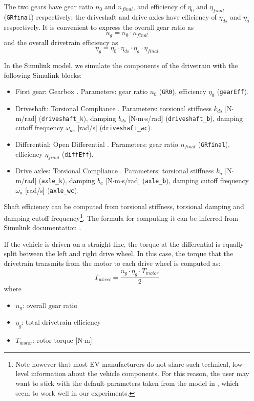 The two gears have gear ratio $n_0$ and $n_{final}$, and efficiency of $\eta_0$ and $\eta_{final}$ (\texttt{GRfinal}) respectively; the driveshaft and drive axles have efficiency of $\eta_{ds}$ and $\eta_a$ respectively. It is convenient to express the overall gear ratio as
\begin{equation}
    n_g = n_0 \cdot n_{final}
\end{equation}
and the overall drivetrain efficiency as
\begin{equation}
    \eta_g = \eta_0 \cdot \eta_{ds} \cdot \eta_a \cdot \eta_{final}
\end{equation}

In the Simulink model, we simulate the components of the drivetrain with the following Simulink blocks:
\begin{itemize}
    \item First gear: Gearbox \cite{mathworks:gearbox}. Parameters: gear ratio $n_0$ (\texttt{GR0}), efficiency $\eta_0$ (\texttt{gearEff}).
    \item Driveshaft: Torsional Compliance \cite{mathworks:torsional_compliance}. Parameters: torsional stiffness $k_{ds}$ [N$\cdot$m/rad] (\texttt{driveshaft\_k}), damping $b_{ds}$ [N$\cdot$m$\cdot$s/rad] (\texttt{driveshaft\_b}), damping cutoff frequency $\omega_{ds}$ [rad/s] (\texttt{driveshaft\_wc}).
    \item Differential: Open Differential \cite{mathworks:differential}. Parameters: gear ratio $n_{final}$ (\texttt{GRfinal}), efficiency $\eta_{final}$ (\texttt{diffEff}).
    \item Drive axles: Torsional Compliance \cite{mathworks:torsional_compliance}. Parameters: torsional stiffness $k_a$ [N$\cdot$m/rad] (\texttt{axle\_k}), damping $b_a$ [N$\cdot$m$\cdot$s/rad] (\texttt{axle\_b}), damping cutoff frequency $\omega_a$ [rad/s] (\texttt{axle\_wc}).
\end{itemize}
Shaft efficiency can be computed from torsional stiffness, torsional damping and damping cutoff frequency\footnote{Note however that most EV manufacturers do not share such technical, low-level information about the vehicle components. For this reason, the user may want to stick with the default parameters taken from the model in \cite{racing_lounge}, which seem to work well in our experiments.}. The formula for computing it can be inferred from Simulink documentation \cite{mathworks:torsional_compliance}. 

If the vehicle is driven on a straight line, the torque at the differential is equally split between the left and right drive wheel. In this case, the torque that the drivetrain transmits from the motor to each drive wheel is computed as:
\begin{equation}
T_{wheel} = \frac{n_g \cdot \eta_{g} \cdot T_{motor}}{2}
\end{equation}
where
\begin{itemize}
    \item $n_g$: overall gear ratio
    \item $\eta_g$: total drivetrain efficiency
    \item $T_{motor}$: rotor torque [N$\cdot$m]
\end{itemize}



